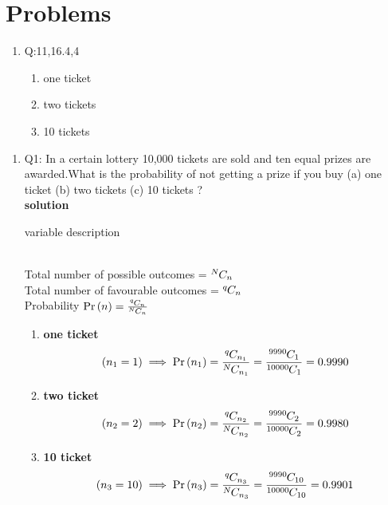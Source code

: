 \documentclass[10pt, a4paper]{article}
\title{\mytitle}
\author{\myauthor\hspace{1em}\\\contact\\FWC22088\hspace{6.5em}IITH\hspace{0.5em}\mymodule\hspace{6em}probability}
\providecommand{\brak}[1]{\ensuremath{\left(#1\right)}}
\providecommand{\pr}[1]{\ensuremath{\Pr\left(#1\right)}}
\newcommand*{\permcomb}[4][0mu]{{{}^{#3}\mkern#1#2_{#4}}}
\newcommand*{\comb}[1][-1mu]{\permcomb[#1]{C}}
\begin{document}
	\maketitle
\section{Problems}
\begin{enumerate}
\item Q:11,16.4,4
\begin{enumerate}
\item one ticket
\item two tickets
\item 10 tickets
\end{enumerate}
\end{enumerate}
\begin{enumerate}
\item Q1: In a certain lottery 10,000 tickets are sold and ten equal prizes are awarded.What is the probability of not getting a prize if you buy (a) one ticket (b) two tickets (c) 10 tickets ?	
\\\textbf{solution}
\begin{table}[h]
	
	\caption{variable description}\label{Table1}
\end{table}
\\Total number of possible outcomes = $\comb{N}{n}$\\
Total number of favourable outcomes = $\comb{q}{n}$\\
Probability $\pr{n} = \frac{\comb{q}{n}}{\comb{N}{n}}$ 
\begin{enumerate}
\item \textbf{one ticket}
\begin{align}
\brak{n_1 = 1} \implies
\pr{n_1}= \frac{\comb{q}{n_1}}{\comb{N}{n_1}}
=\frac{\comb{9990}{1}}{\comb{10000}{1}} = 0.9990
\end{align}
\item \textbf{two ticket}
\begin{align}
\brak{n_2 = 2 }\implies  \pr{n_2} =  \frac{\comb{q}{n_2}}{\comb{N}{n_2}}=\frac{\comb{9990}{2}}{\comb{10000}{2}} = 0.9980
\end{align}
\item \textbf{10 ticket}
\begin{align}
\brak{n_3 = 10} \implies  \pr{n_3} = \frac{\comb{q}{n_3}}{\comb{N}{n_3}}=\frac{\comb{9990}{10}}{\comb{10000}{10}} = 0.9901
\end{align}
\end{enumerate}
\end{enumerate}
\end{document}

